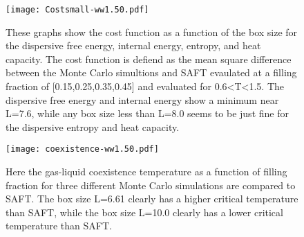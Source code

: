 \pagebreak
\begin{figure}[h]
\vspace*{-7mm}
\hspace*{-6mm}
	\centering
	\texttt{[image: Costsmall-ww1.50.pdf]}
	\caption{\scriptsize
	These graphs show the cost function as a function of the box size for the dispersive free energy, internal energy, entropy, and heat capacity. The cost function is defiend as the mean square difference between the Monte Carlo simultions and SAFT evaulated at a filling fraction of [0.15,0.25,0.35,0.45] and evaluated for 0.6\textless T\textless 1.5. The dispersive free energy and internal energy show a minimum near L=7.6, while any box size less than L=8.0 seems to be just fine for the dispersive entropy and heat capacity.}
	\label{fig:Cost}
\end{figure}
\begin{figure}[h]
\vspace*{-7mm}
\hspace*{-6mm}
	\centering
	\texttt{[image: coexistence-ww1.50.pdf]}
	\caption{\scriptsize
	Here the gas-liquid coexistence temperature as a function of filling fraction for three different Monte Carlo simulations are compared to SAFT. The box size L=6.61 clearly has a higher critical temperature than SAFT, while the box size L=10.0 clearly has a lower critical temperature than SAFT.}
	\label{fig:Coexistence}
\end{figure}



